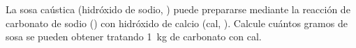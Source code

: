 La sosa caústica (hidróxido de sodio, ) puede prepararse mediante la reacción de carbonato de sodio () con hidróxido de calcio (cal, ). Calcule cuántos gramos de sosa se pueden obtener tratando \SI{1}{\kilogram} de carbonato con cal.
